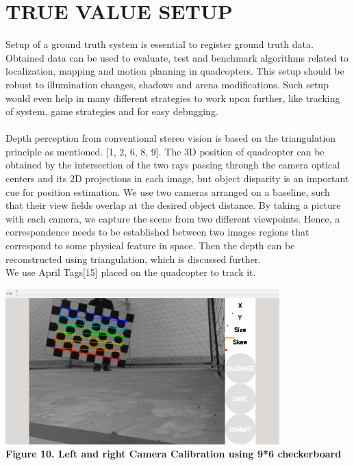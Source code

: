 \documentclass[12pt]{article}
\begin{document}
\section{TRUE VALUE SETUP}
Setup of a ground truth system is essential to register ground truth data. Obtained data can be used to evaluate, test and benchmark algorithms related to localization, mapping and motion planning in quadcopters. This setup should be robust to illumination changes, shadows and arena modifications. Such setup would even help in many different strategies to work upon further, like tracking of system, game strategies and for easy debugging. \\ \\
Depth perception from conventional stereo vision is based on the triangulation principle as mentioned. [1, 2, 6, 8, 9]. The 3D position of quadcopter can be obtained by the intersection of the two rays passing through the camera optical centers and its 2D projections in each image, but object disparity is an important cue for position estimation. We use two cameras arranged on a baseline, such that their view fields overlap at the desired object distance. By taking a picture with each camera, we capture the scene from two different viewpoints. Hence, a correspondence needs to be established between two images regions that correspond to some physical feature in space. Then the depth can be reconstructed using triangulation, which is discussed further. \\
We use April Tags[15] placed on the quadcopter to track it.
\begin{center}\includegraphics{image42} \\
\textbf{Figure 10. Left and right Camera Calibration using 9*6 checkerboard}\end{center}\\
\end{document}

